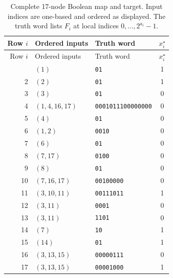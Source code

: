 
\begin{longtable}{r l l c}
\caption{Complete 17-node Boolean map and target. Input indices are one-based and ordered as displayed. The truth word lists $F_i$ at local indices $0,\ldots,2^{a_i}-1$.}\label{tab:rules17}\\
\toprule Row $i$ & Ordered inputs & Truth word & $x_i^\star$\\\midrule\endfirsthead
\toprule Row $i$ & Ordered inputs & Truth word & $x_i^\star$\\\midrule\endhead
\bottomrule\endfoot
1 & $(1)$ & \texttt{01} & 1\\
2 & $(2)$ & \texttt{01} & 1\\
3 & $(3)$ & \texttt{01} & 0\\
4 & $(1,4,16,17)$ & \texttt{0001011100000000} & 0\\
5 & $(4)$ & \texttt{01} & 0\\
6 & $(1,2)$ & \texttt{0010} & 0\\
7 & $(6)$ & \texttt{01} & 0\\
8 & $(7,17)$ & \texttt{0100} & 0\\
9 & $(8)$ & \texttt{01} & 0\\
10 & $(7,16,17)$ & \texttt{00100000} & 0\\
11 & $(3,10,11)$ & \texttt{00111011} & 1\\
12 & $(3,11)$ & \texttt{0001} & 0\\
13 & $(3,11)$ & \texttt{1101} & 0\\
14 & $(7)$ & \texttt{10} & 1\\
15 & $(14)$ & \texttt{01} & 1\\
16 & $(3,13,15)$ & \texttt{00000111} & 0\\
17 & $(3,13,15)$ & \texttt{00001000} & 1\\
\end{longtable}

